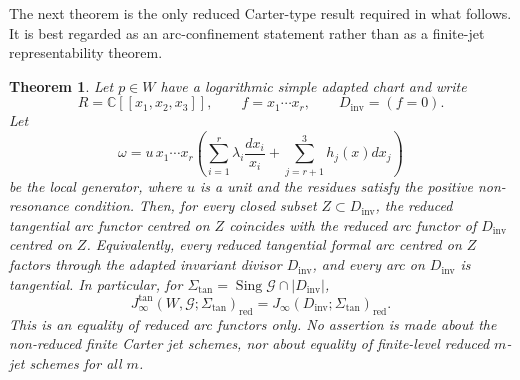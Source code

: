 \documentclass[10pt,a4paper]{amsart}
\numberwithin{equation}{section}
\newtheorem{Theorem}{Theorem}[section]
\newcommand{\Sing}{\operatorname{Sing}}
\newcommand{\Sigmatan}{\Sigma_{\mathrm{tan}}}
\newcommand{\red}{\mathrm{red}}
\newcommand{\Dinv}{D_{\mathrm{inv}}}
\newcommand{\bC}{\mathbb C}
\newcommand{\cG}{\mathcal G}
\begin{document}
The next theorem is the only reduced Carter-type result required in what follows.  It is
best regarded as an arc-confinement statement rather than as a finite-jet
representability theorem.


\begin{Theorem} 
\label{thm:carter-representability}
Let $p\in W$ have a logarithmic simple adapted chart and write
\[
R=\bC[[x_1,x_2,x_3]],\qquad f=x_1\cdots x_r,
\qquad \Dinv=(f=0).
\]
Let
\[
\omega=
u\,x_1\cdots x_r
\left(
\sum_{i=1}^r \lambda_i\frac{dx_i}{x_i}
+
\sum_{j=r+1}^3 h_j(x)dx_j
\right)
\]
be the local generator, where $u$ is a unit and the residues satisfy the
positive non-resonance condition.  Then, for every closed subset
$Z\subset \Dinv$, the reduced tangential arc functor centred on $Z$
coincides with the reduced arc functor of $\Dinv$ centred on $Z$.
Equivalently, every reduced tangential formal arc centred on $Z$ factors
through the adapted invariant divisor $\Dinv$, and every arc on
$\Dinv$ is tangential.  In particular, for
$\Sigmatan=\Sing\cG\cap |\Dinv|$,
\[
J_\infty^{\tan}(W,\cG;\Sigmatan)_{\red}
=
J_\infty(\Dinv;\Sigmatan)_{\red}.
\]
This is an equality of reduced arc functors only.  No assertion is made about
the non-reduced finite Carter jet schemes, nor about equality of finite-level
reduced $m$-jet schemes for all $m$.
\end{Theorem}
\end{document}
